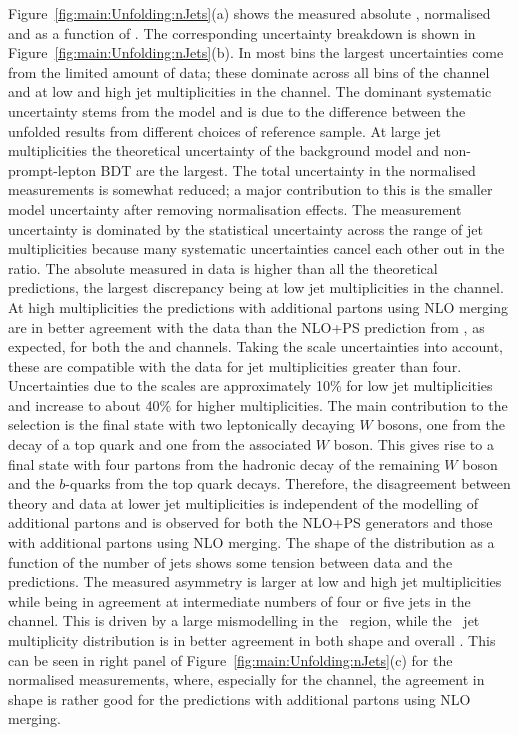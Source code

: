 \documentclass[cernpreprint, atlasdraft=false, texlive=2023, UKenglish, texmf, orcidlogo]{atlasdoc}
\begin{document}
 
Figure~\ref{fig:main:Unfolding:nJets}(a) shows the measured
absolute \xs, normalised \xs and \rqasym as a function
of \njets. The corresponding uncertainty breakdown is shown in
Figure~\ref{fig:main:Unfolding:nJets}(b). In most bins the largest
uncertainties come from the limited amount of data; these dominate
across all bins of the \lll channel and at low and high jet
multiplicities in the \llSS channel. The dominant systematic
uncertainty stems from the \ttW model and is due to the difference between
the unfolded results from different choices of \ttW reference
sample. At large jet multiplicities the theoretical uncertainty of
the background model and non-prompt-lepton BDT are the largest.  The total uncertainty in the normalised \xs
measurements is somewhat reduced; a major contribution to this is the
smaller \ttW model uncertainty after removing normalisation effects.
The \rqasym measurement uncertainty is dominated by the statistical
uncertainty across the range of jet multiplicities because many systematic
uncertainties cancel each other out in the ratio.
The absolute \xs measured in data is higher than all the theoretical predictions,
the largest discrepancy being at low jet multiplicities in the \llSS channel.
At high multiplicities the predictions with additional partons using NLO
merging are in better agreement with the data than the NLO+PS
prediction from \POWHEG, as expected, for both the \llSS and \lll
channels. Taking the scale uncertainties into account, these are
compatible with the data for jet multiplicities greater than four.
Uncertainties due to the scales are approximately 10\% for low jet
multiplicities and increase to about 40\% for higher
multiplicities.  The main \ttW contribution to the \llSS selection is
the final state with two leptonically decaying $W$ bosons, one from
the decay of a top quark and one from the associated $W$ boson. This
gives rise to a final state with four partons from the hadronic decay
of the remaining $W$ boson and the $b$-quarks from the top quark
decays. Therefore, the disagreement between theory and data at lower
jet multiplicities is independent of the modelling of additional
partons and is observed for both the NLO+PS generators and those with
additional partons using NLO merging.  The shape of the \rqasym
distribution as a function of the number of jets shows some tension
between data and the predictions. The measured asymmetry is
larger at low and high jet multiplicities while being in agreement at
intermediate numbers of four or five jets in the \llSS channel. This is
driven by a large mismodelling in the \twopp~region, while
the \twomm~jet multiplicity distribution is in better agreement in
both shape and overall \xs. This can be seen in right panel of
Figure~\ref{fig:main:Unfolding:nJets}(c) for the
normalised \xs measurements, where, especially for the \llSS channel,
the agreement in shape is rather good for the predictions with
additional partons using NLO merging.
 
\end{document}
